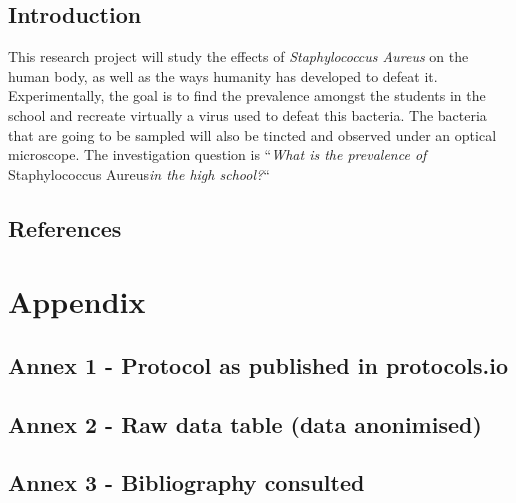\documentclass[fontsize=12pt,twoside=semi,openright,numbers=noenddot,parskip=half]{scrbook}
\begin{document}
\chapter*{Introduction}
This research project will study the effects of \emph{Staphylococcus Aureus} on the human body, as well as the ways humanity has developed to defeat it. Experimentally, the goal is to find the prevalence amongst the students in the school and recreate virtually a virus used to defeat this bacteria. The bacteria that are going to be sampled will also be tincted and observed under an optical microscope.\newline
The investigation question is ``\emph{What is the prevalence of} Staphylococcus Aureus\emph{in the high school?}``




%
%
\backmatter
\renewcommand{\thepage}{\Roman{page}}\setcounter{page}{0}
\clearpage\chapter{References}
\printbibliography[title={Works referenced}]
\renewcommand{\thepage}{\Roman{page}}\setcounter{page}{1}
\part{Appendix}\appendix
\chapter{Annex 1 - Protocol as published in protocols.io}

\clearpage\appendix\chapter{Annex 2 - Raw data table (data anonimised)}

\chapter{Annex 3 - Bibliography consulted}

\end{document}
